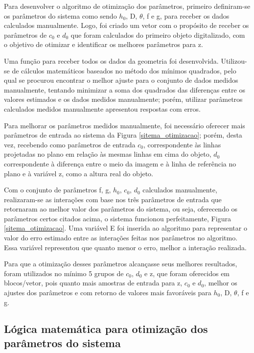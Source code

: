 \documentclass[a4paper, 12pt]{article}
\begin{document}
Para desenvolver o algoritmo de otimização dos parâmetros, primeiro definiram-se os parâmetros do sistema como sendo $h_0$, D, $\theta$, f e g, para receber os dados calculados manualmente. Logo, foi criado um vetor com o propósito de receber os parâmetros de $c_0$ e $d_0$ que foram calculados do primeiro objeto digitalizado, com o objetivo de otimizar e identificar os melhores parâmetros para z.

Uma função para receber todos os dados da geometria foi desenvolvida. Utilizou-se de cálculos matemáticos baseados no método dos mínimos quadrados, pelo qual se procurou encontrar o melhor ajuste para o conjunto de dados medidos manualmente, tentando minimizar a soma dos quadrados das diferenças entre os valores estimados e os dados medidos manualmente; porém, utilizar parâmetros calculados medidos manualmente apresentou respostas com erros.

Para melhorar os parâmetros medidos manualmente, foi necessário oferecer mais parâmetros de entrada ao sistema da Figura \ref{sitema_otimizacao}; porém, desta vez, recebendo como parâmetros de entrada $c_0$, correspondente às linhas projetadas no plano em relação às mesmas linhas em cima do objeto, $d_0$ correspondente à diferença entre o meio da imagem e à linha de referência no plano e à variável z, como a altura real do objeto.

Com o conjunto de parâmetros f, g, $h_0$, $c_0$, $d_0$ calculados manualmente, realizaram-se as interações com base nos três parâmetros de entrada que retornaram ao melhor valor dos parâmetros do sistema, ou seja, oferecendo os parâmetros certos citados acima, o sistema funcionou perfeitamente, Figura \ref{sitema_otimizacao}. Uma variável E foi inserida ao algoritmo para representar o valor do erro estimado entre as interações feitas nos parâmetros no algoritmo. Essa variável representou que quanto menor o erro, melhor a interação realizada.

Para que a otimização desses parâmetros alcançasse seus melhores resultados, foram utilizados no mínimo 5 grupos de $c_0$, $d_0$ e z, que foram oferecidos em blocos/vetor, pois quanto mais amostras de entrada para z, $c_0$ e $d_0$, melhor os ajustes dos parâmetros e com retorno de valores mais favoráveis para $h_0$, D, $\theta$, f e g. 

\subsection{Lógica matemática para otimização dos parâmetros do sistema}
\end{document}
